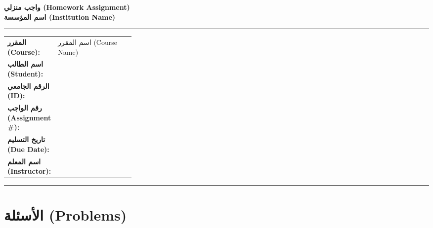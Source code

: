 \documentclass[11pt,a4paper]{article}
\begin{document}
\begin{center}
{\LARGE\bfseries واجب منزلي (Homework Assignment)}\\[0.4em]
{\large\bfseries اسم المؤسسة (Institution Name)}
\end{center}

\vspace{0.3em}
{\color{hdraccent}\rule{\linewidth}{1.2pt}}
\vspace{0.5em}

\noindent
\begin{tabularx}{\linewidth}{@{}p{0.30\linewidth}X@{}}
\textbf{المقرر (Course):} & %
اسم المقرر (Course Name) \\
\textbf{اسم الطالب (Student):} & %
\hrulefill \\
\textbf{الرقم الجامعي (ID):} & %
\hrulefill \\
\textbf{رقم الواجب (Assignment \#):} & %
\hrulefill \\
\textbf{تاريخ التسليم (Due Date):} & %
\hrulefill \\
\textbf{اسم المعلم (Instructor):} & %
\hrulefill \\
\end{tabularx}

\vspace{0.4em}
{\color{hdraccent}\rule{\linewidth}{0.8pt}}
\vspace{0.8em}

\section*{الأسئلة (Problems)}
\end{document}
